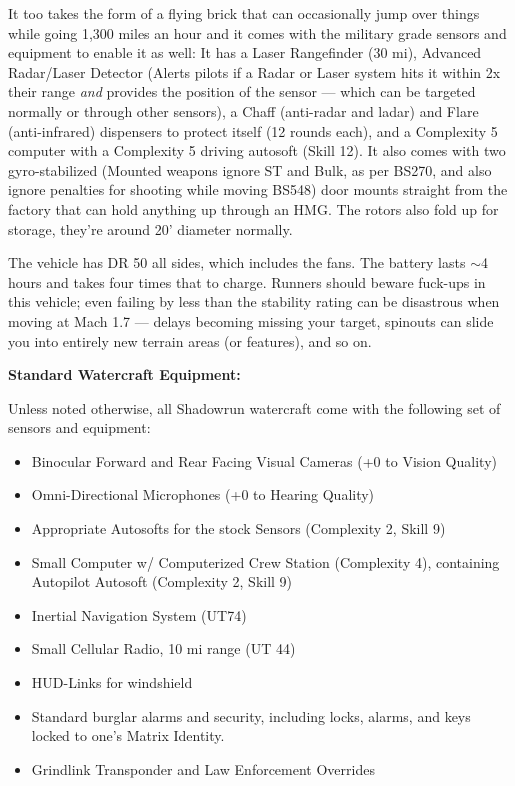  It too takes the form of a flying brick that can occasionally jump over things while going 1,300 miles an hour and it comes with the military grade sensors and equipment to enable it as well: It has a Laser Rangefinder (30 mi), Advanced Radar/Laser Detector (Alerts pilots if a Radar or Laser system hits it within 2x their range \textit{and} provides the position of the sensor — which can be targeted normally or through other sensors), a Chaff (anti-radar and ladar) and Flare (anti-infrared) dispensers to protect itself (12 rounds each), and a Complexity 5 computer with a Complexity 5 driving autosoft (Skill 12). It also comes with two gyro-stabilized (Mounted weapons ignore ST and Bulk, as per BS270, and also ignore penalties for shooting while moving BS548) door mounts straight from the factory that can hold anything up through an HMG. The rotors also fold up for storage, they're around 20' diameter normally.
 
 The vehicle has DR 50 all sides, which includes the fans. The battery lasts $\sim$4 hours and takes four times that to charge. Runners should beware fuck-ups in this vehicle; even failing by less than the stability rating can be disastrous when moving at Mach 1.7 — delays becoming missing your target, spinouts can slide you into entirely new terrain areas (or features), and so on.
 
 \textbf{Standard Watercraft Equipment:}
 
 Unless noted otherwise, all Shadowrun watercraft come with the following set of sensors and equipment:
 \begin{itemize}
 	\itemsep 0pt
 	\item Binocular Forward and Rear Facing Visual Cameras (+0 to Vision Quality)
 	\item Omni-Directional Microphones (+0 to Hearing Quality)
 	\item Appropriate Autosofts for the stock Sensors (Complexity 2, Skill 9)
 	\item Small Computer w/ Computerized Crew Station (Complexity 4), containing Autopilot Autosoft (Complexity 2, Skill 9)
 	\item Inertial Navigation System (UT74) 
 	\item Small Cellular Radio, 10 mi range (UT 44)
 	\item HUD-Links for windshield
 	\item Standard burglar alarms and security, including locks, alarms, and keys locked to one's Matrix Identity.
 	\item Grindlink Transponder and Law Enforcement Overrides
 \end{itemize}

